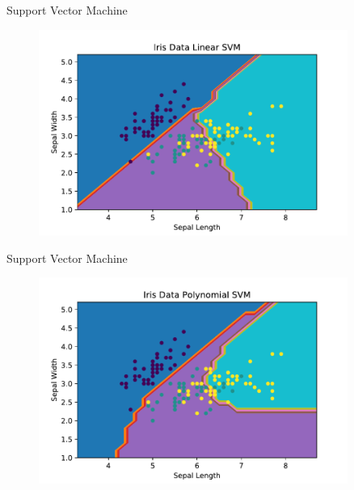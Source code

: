 \documentclass[10pt]{beamer}
\begin{document}
\begin{frame}{Support Vector Machine}
	\begin{figure}	
		\includegraphics[width=0.9\textwidth, center, trim=0cm 0cm 0 0cm]{images/Iris_Data_labeled_linear.pdf}
	\end{figure}
\end{frame}

\begin{frame}{Support Vector Machine}
	\begin{figure}	
		\includegraphics[width=0.9\textwidth, center, trim=0cm 0cm 0 0cm]{images/Iris_Data_labeled_poly.pdf}
	\end{figure}
\end{frame}
\end{document}
